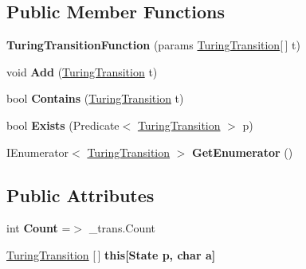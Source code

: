 \subsection*{Public Member Functions}
\begin{DoxyCompactItemize}
\item 
\mbox{\label{class_system_1_1_automata_1_1_turing_transition_function_aaa2341e389d0d2a4291b5379bc8e110f}} 
{\bfseries Turing\+Transition\+Function} (params \mbox{\hyperlink{class_system_1_1_automata_1_1_turing_transition}{Turing\+Transition}}\mbox{[}$\,$\mbox{]} t)
\item 
\mbox{\label{class_system_1_1_automata_1_1_turing_transition_function_a3b2a9439a7742e55d003002065746e7e}} 
void {\bfseries Add} (\mbox{\hyperlink{class_system_1_1_automata_1_1_turing_transition}{Turing\+Transition}} t)
\item 
\mbox{\label{class_system_1_1_automata_1_1_turing_transition_function_a7db6f1271627564f81e7354709248af6}} 
bool {\bfseries Contains} (\mbox{\hyperlink{class_system_1_1_automata_1_1_turing_transition}{Turing\+Transition}} t)
\item 
\mbox{\label{class_system_1_1_automata_1_1_turing_transition_function_aa297d69ac197b1887ef5769a27b1a2b9}} 
bool {\bfseries Exists} (Predicate$<$ \mbox{\hyperlink{class_system_1_1_automata_1_1_turing_transition}{Turing\+Transition}} $>$ p)
\item 
\mbox{\label{class_system_1_1_automata_1_1_turing_transition_function_a7be9f8007ad5e06b2b09e73c15e4bd81}} 
I\+Enumerator$<$ \mbox{\hyperlink{class_system_1_1_automata_1_1_turing_transition}{Turing\+Transition}} $>$ {\bfseries Get\+Enumerator} ()
\end{DoxyCompactItemize}
\subsection*{Public Attributes}
\begin{DoxyCompactItemize}
\item 
\mbox{\label{class_system_1_1_automata_1_1_turing_transition_function_a768db7b6eb2d61eeb49ea912da85ba8f}} 
int {\bfseries Count} =$>$ \+\_\+trans.\+Count
\item 
\mbox{\hyperlink{class_system_1_1_automata_1_1_turing_transition}{Turing\+Transition}} \mbox{[}$\,$\mbox{]} {\bfseries this\mbox{[}\+State p, char a\mbox{]}}
\end{DoxyCompactItemize}


